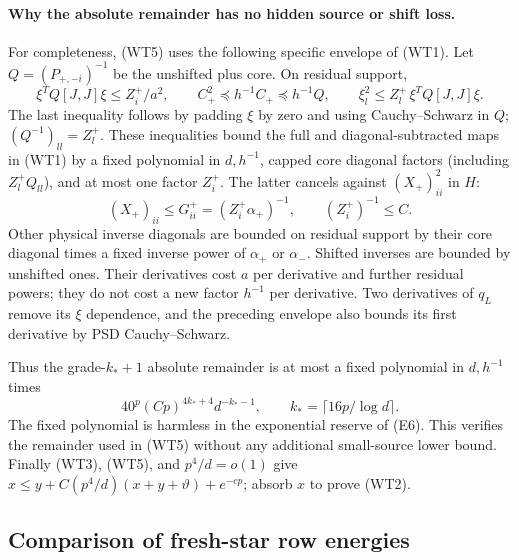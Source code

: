 \documentclass[10pt]{article}
\numberwithin{equation}{section}
\newcommand{\1}{\mathbf1}
\begin{document}
\paragraph{Why the absolute remainder has no hidden source or shift loss.}
For completeness, (WT5) uses the following specific envelope of (WT1).
Let $Q=(P_{+,-i})^{-1}$ be the unshifted plus core.  On residual
support,
\[
 \xi^TQ[J,J]\xi\le Z_i^+/a^2,\qquad
 C_+^2\preceq h^{-1}C_+\preceq h^{-1}Q,
 \qquad
 \xi_l^2\le Z_l^+\,\xi^TQ[J,J]\xi.
\]
The last inequality follows by padding $\xi$ by zero and using
Cauchy--Schwarz in $Q$; $(Q^{-1})_{ll}=Z_l^+$.
These inequalities bound the full and diagonal-subtracted maps in
(WT1) by a fixed polynomial in $d,h^{-1}$, capped core diagonal
factors (including $Z_l^+Q_{ll}$), and at most one factor $Z_i^+$.
The latter cancels against $(X_+)_{ii}^2$ in $H$:
\[
 (X_+)_{ii}\le G^+_{ii}=(Z_i^+\alpha_+)^{-1},
 \qquad (Z_i^+)^{-1}\le C.
\]
Other physical inverse diagonals are bounded on residual support by
their core diagonal times a fixed inverse power of $\alpha_+$ or
$\alpha_-$.  Shifted inverses are bounded by unshifted ones.
Their derivatives cost $a$ per derivative and further residual powers;
they do not cost a new factor $h^{-1}$ per derivative.  Two derivatives
of $q_L$ remove its $\xi$ dependence, and the preceding envelope also
bounds its first derivative by PSD Cauchy--Schwarz.

Thus the grade-$k_*+1$ absolute remainder is at most a fixed polynomial
in $d,h^{-1}$ times
\[
 40^p(Cp)^{4k_*+4}d^{-k_*-1},\qquad
 k_*=\lceil16p/\log d\rceil.
\]
The fixed polynomial is harmless in the exponential reserve of (E6).
This verifies the remainder used in (WT5) without any additional
small-source lower bound.  Finally (WT3), (WT5), and $p^4/d=o(1)$
give $x\le y+C(p^4/d)(x+y+\vartheta)+e^{-cp}$; absorb $x$ to prove
(WT2).

\subsection{Comparison of fresh-star row energies}
\end{document}
